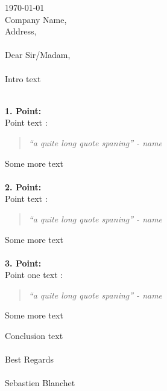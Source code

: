 \documentclass[11]{cov}
\begin{document}


\begin{resume}
\npspctoprule
\today \\
Company Name,\\
Address, \\
\\
Dear Sir/Madam,\\
\\
Intro text \\
\begin{addmargin}[2em]{2em}

\\ \textbf{1. Point:} \\
Point text : \\
\begin{quote}
\begin{flushright}
\textsl{``a quite long quote spaning'' - name\\}
\end{flushright}
\end{quote}
Some more text \\

\\ \textbf{2. Point:} \\
Point text : \\
\begin{quote}
\textsl{``a quite long quote spaning'' - name\\}
\end{quote}
Some more text \\

\\ \textbf{3. Point:} \\
Point one text : \\
\begin{quote}
\textsl{``a quite long quote spaning'' - name\\}
\end{quote}
Some more text \\

\end{addmargin}

Conclusion text\\
\\
Best Regards\\
\\
Sebastien Blanchet
\end{resume}
\end{document}
